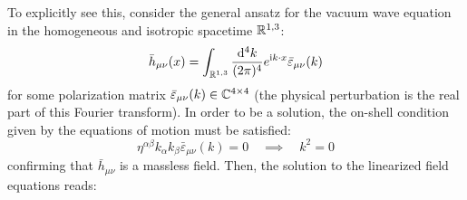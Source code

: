 To explicitly see this, consider the general ansatz for the vacuum wave equation in the homogeneous and isotropic spacetime $ \mathbb{R}^{1,3} $:
\begin{equation*}
  \bar{h}_{\mu \nu}(x) = \int_{\mathbb{R}^{1,3}} \frac{\mathrm{d}^4k}{(2\pi)^4} e^{\mathrm{i} k \cdot x} \bar{\varepsilon}_{\mu \nu}(k)
\end{equation*}
for some polarization matrix $ \bar{\varepsilon}_{\mu \nu}(k) \in \mathbb{C}^{4 \times 4} $ (the physical perturbation is the real part of this Fourier transform). In order to be a solution, the on-shell condition given by the equations of motion  must be satisfied:
\begin{equation*}
  \eta^{\alpha \beta} k_\alpha k_\beta \bar{\varepsilon}_{\mu \nu}(k) = 0
  \quad \implies \quad
  k^2 = 0
\end{equation*}
confirming that $ \bar{h}_{\mu \nu} $ is a massless field\footnotemark. Then, the solution to the linearized field equations reads:


